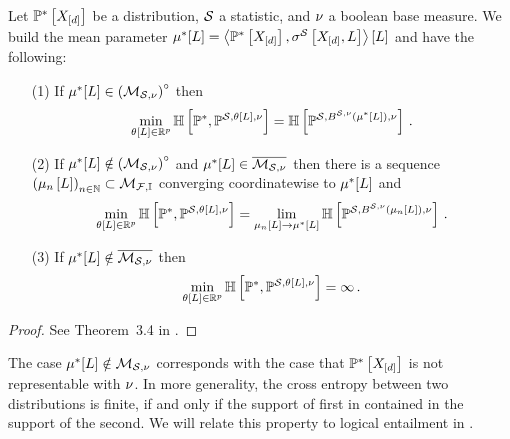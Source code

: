 \begin{lemma}
    \label{lem:minCrossEntropyExponential}
    Let $\mathbb{P}^*\left[X_{[d]}\right]$ be a distribution, $\mathcal{S}$ a statistic, and $\nu$ a boolean base measure.
    We build the mean parameter $\mu^*[L]=\left\langle \mathbb{P}^*\left[X_{[d]}\right],\sigma^{\mathcal{S}}\left[X_{[d]},L\right]\right\rangle \left[ L \right]$ and have the following:
    \begin{itemize}
        \item[(1)] If $\mu^*[L] \in {\left(\mathcal{M}_{\mathcal{S},\nu}\right)}^{\circ}$ then
        \begin{align*}
            \min_{\theta\left[L\right]\in\mathbb{R}^{p}} \mathbb{H}\left[\mathbb{P}^*,\mathbb{P}^{\mathcal{S},\theta\left[L\right],\nu}\right]
            = \mathbb{H}\left[\mathbb{P}^{\mathcal{S},B^{\mathcal{S},\nu}(\mu^*[L]),\nu}\right] \, .
        \end{align*}
        \item[(2)] If $\mu^*[L] \notin {\left(\mathcal{M}_{\mathcal{S},\nu}\right)}^{\circ}$ and $\mu^*[L]\in\overline{\mathcal{M}_{\mathcal{S},\nu}}$ then there is a sequence $\left(\mu_{n}\left[L\right]\right)_{n\in\mathbb{N}}\subset\mathcal{M}_{\mathcal{F},\mathbb{I}}$ converging coordinatewise to $\mu^*[L]$ and
        \begin{align*}
            \min_{\theta\left[L\right]\in\mathbb{R}^{p}} \mathbb{H}\left[\mathbb{P}^*,\mathbb{P}^{\mathcal{S},\theta\left[L\right],\nu}\right]
            = \lim_{\mu_{n}\left[L\right]\rightarrow\mu^*[L]}
            \mathbb{H}\left[\mathbb{P}^{\mathcal{S},B^{\mathcal{S},\nu}(\mu_{n}\left[L\right]),\nu}\right] \, .
        \end{align*}
        \item[(3)] If $\mu^*[L]\notin\overline{\mathcal{M}_{\mathcal{S},\nu}}$ then
        \begin{align*}
            \min_{\theta\left[L\right]\in\mathbb{R}^{p}} \mathbb{H}\left[\mathbb{P}^*,\mathbb{P}^{\mathcal{S},\theta\left[L\right],\nu}\right]
            = \infty \, .
        \end{align*}
    \end{itemize}
\end{lemma}
\begin{proof}
    See Theorem~3.4 in \cite{wainwright_graphical_2008}.
\end{proof}

The case $\mu^*[L]\notin\mathcal{M}_{\mathcal{S},\nu}$ corresponds with the case that $\mathbb{P}^*\left[X_{[d]}\right]$ is not representable with $\nu$.
In more generality, the cross entropy between two distributions is finite, if and only if the support of first in contained in the support of the second.
We will relate this property to logical entailment in . %

